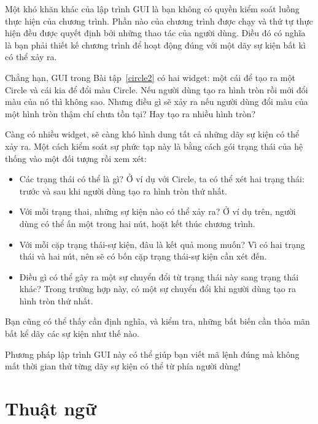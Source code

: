 \documentclass[11pt]{book}
\begin{document}

Một khó khăn khác của lập trình GUI là bạn không có quyền kiểm soát
luồng thực hiện của chương trình. Phần nào của chương trình được chạy
và thứ tự thực hiện đều được quyết định bởi những thao tác của người dùng.
Điều đó có nghĩa là bạn phải thiết kế chương trình để hoạt động đúng
với một dãy sự kiện bất kì có thể xảy ra.

Chẳng hạn, GUI trong Bài tập~\ref{circle2} có hai widget:
một cái để tạo ra một Circle và cái kia để đổi màu
Circle.  Nếu người dùng tạo ra hình tròn rồi mới đổi màu của nó 
thì không sao. Nhưng điều gì sẽ xảy ra nếu người dùng đổi màu của
một hình tròn thậm chí chưa tồn tại? Hay tạo ra nhiều hình tròn?

Càng có nhiều widget, sẽ càng khó hình dung 
tất cả những dãy sự kiện có thể xảy ra. Một cách kiểm soát
sự phức tạp này là bằng cách gói trạng thái của hệ thống vào một
đối tượng rồi xem xét:

\begin{itemize}

\item Các trạng thái có thể là gì? Ở ví dụ với Circle, ta
có thể xét hai trạng thái: trước và sau khi người dùng tạo ra
hình tròn thứ nhất.

\item Với mỗi trạng thai, những sự kiện nào có thể xảy ra? Ở ví dụ trên,
người dùng có thể ấn một trong hai nút, hoặt kết thúc chương trình.

\item Với mỗi cặp trạng thái-sự kiện, đâu là kết quả mong muốn?
Vì có hai trạng thái và hai nút, nên sẽ có bốn cặp trạng thái-sự kiện
cần xét đến.

\item Điều gì có thể gây ra một sự chuyển đổi từ trạng thái này sang
trạng thái khác? Trong trường hợp này, có một sự chuyển đổi khi người dùng
tạo ra hình tròn thứ nhất.

\end{itemize}

Bạn cũng có thể thấy cần định nghĩa, và kiểm tra, những bất biến cần
thỏa mãn bất kể dãy các sự kiện như thế nào.


Phương pháp lập trình GUI này có thể giúp bạn viết mã lệnh đúng
mà không mất thời gian thử từng dãy sự kiện có thể từ phía người dùng!


\section{Thuật ngữ}
\end{document}
